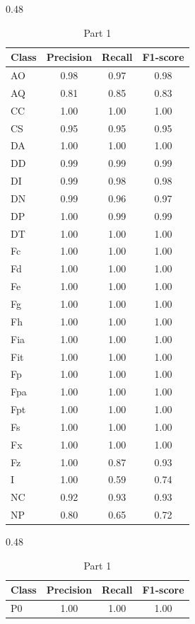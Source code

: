 \begin{table}[H]
\centering
\small

\begin{subtable}{0.48\textwidth}
\centering
\begin{tabular}{lccc}
\hline
\textbf{Class} & \textbf{Precision} & \textbf{Recall} & \textbf{F1-score} \\
\hline
AO  & 0.98 & 0.97 & 0.98 \\
AQ  & 0.81 & 0.85 & 0.83 \\
CC  & 1.00 & 1.00 & 1.00 \\
CS  & 0.95 & 0.95 & 0.95 \\
DA  & 1.00 & 1.00 & 1.00 \\
DD  & 0.99 & 0.99 & 0.99 \\
DI  & 0.99 & 0.98 & 0.98 \\
DN  & 0.99 & 0.96 & 0.97 \\
DP  & 1.00 & 0.99 & 0.99 \\
DT  & 1.00 & 1.00 & 1.00 \\
Fc  & 1.00 & 1.00 & 1.00 \\
Fd  & 1.00 & 1.00 & 1.00 \\
Fe  & 1.00 & 1.00 & 1.00 \\
Fg  & 1.00 & 1.00 & 1.00 \\
Fh  & 1.00 & 1.00 & 1.00 \\
Fia & 1.00 & 1.00 & 1.00 \\
Fit & 1.00 & 1.00 & 1.00 \\
Fp  & 1.00 & 1.00 & 1.00 \\
Fpa & 1.00 & 1.00 & 1.00 \\
Fpt & 1.00 & 1.00 & 1.00 \\
Fs  & 1.00 & 1.00 & 1.00 \\
Fx  & 1.00 & 1.00 & 1.00 \\
Fz  & 1.00 & 0.87 & 0.93 \\
I   & 1.00 & 0.59 & 0.74 \\
NC  & 0.92 & 0.93 & 0.93 \\
NP  & 0.80 & 0.65 & 0.72 \\
\hline
\end{tabular}
\caption{Part 1}
\end{subtable}
\hfill
\begin{subtable}{0.48\textwidth}
\centering
\begin{tabular}{lccc}
\hline
\textbf{Class} & \textbf{Precision} & \textbf{Recall} & \textbf{F1-score} \\
\hline
P0  & 1.00 & 1.00 & 1.00 \\

\end{tabular}
\end{subtable}
\end{table}
